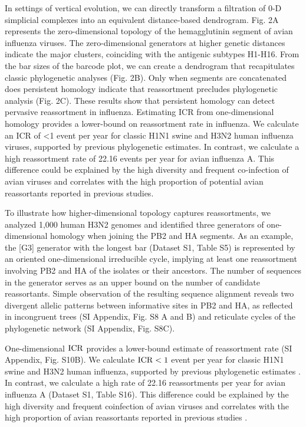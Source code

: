 In settings of vertical evolution, we can directly transform a filtration of 0-D simplicial complexes into an equivalent distance-based dendrogram.
Fig. 2A represents the zero-dimensional topology of the hemagglutinin segment of avian influenza viruses. 
The zero-dimensional generators at higher genetic distances indicate the major clusters, coinciding with the antigenic subtypes H1-H16.
From the bar sizes of the barcode plot, we can create a dendrogram that recapitulates classic phylogenetic analyses (Fig. 2B).
Only when segments are concatenated does persistent homology indicate that reassortment precludes phylogenetic analysis (Fig. 2C).
These results show that persistent homology can detect pervasive reassortment in influenza.
Estimating ICR from one-dimensional homology provides a lower-bound on reassortment rate in influenza.
We calculate an ICR of <1 event per year for classic H1N1 swine and H3N2 human influenza viruses, supported by previous phylogenetic estimates.
In contrast, we calculate a high reassortment rate of 22.16 events per year for avian influenza A.
This difference could be explained by the high diversity and frequent co-infection of avian viruses and correlates with the high proportion of potential avian reassortants reported in previous studies.

To illustrate how higher-dimensional topology captures reassortments, we analyzed 1,000 human H3N2 genomes and identified three generators of one-dimensional homology when joining the PB2 and HA segments.
As an example, the [G3] generator with the longest bar (Dataset S1, Table S5) is represented by an oriented one-dimensional irreducible cycle, implying at least one reassortment involving PB2 and HA of the isolates or their ancestors.
The number of sequences in the generator serves as an upper bound on the number of candidate reassortants.
Simple observation of the resulting sequence alignment reveals two divergent allelic patterns between informative sites in PB2 and HA, as reflected in incongruent trees (SI Appendix, Fig. S8 A and B) and reticulate cycles of the phylogenetic network (SI Appendix, Fig. S8C).

One-dimensional $\operatorname{ICR}$ provides a lower-bound estimate of reassortment rate (SI Appendix, Fig. S10B).
We calculate $\operatorname{ICR} < 1$ event per year for classic H1N1 swine and H3N2 human influenza, supported by previous phylogenetic estimates \cite{Lycett:2012fqa,Holmes:2005cia}.
In contrast, we calculate a high rate of 22.16 reassortments per year for avian influenza A (Dataset S1, Table S16).
This difference could be explained by the high diversity and frequent coinfection of avian viruses \cite{Lubeck:1979ws} and correlates with the high proportion of avian reassortants reported in previous studies \cite{Dugan:2008iba}.

